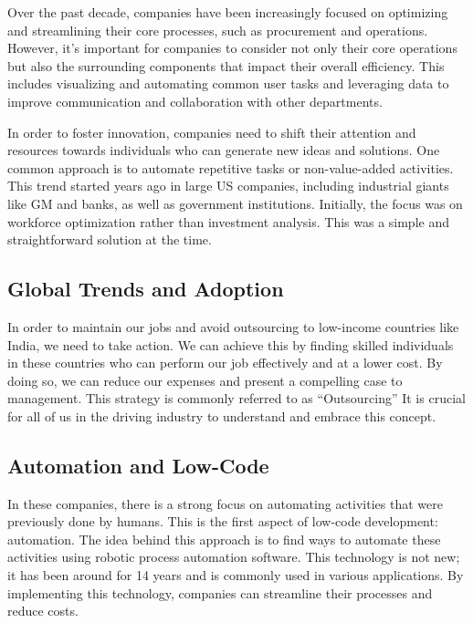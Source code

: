 Over the past decade, companies have
been increasingly focused on optimizing and streamlining their core
processes, such as procurement and operations. However, it's important
for companies to consider not only their core operations but also the
surrounding components that impact their overall efficiency. This
includes visualizing and automating common user tasks and leveraging
data to improve communication and collaboration with other departments.

In order to foster innovation, companies need to shift their attention
and resources towards individuals who can generate new ideas and
solutions. One common approach is to automate repetitive tasks or
non-value-added activities. This trend started years ago in large US
companies, including industrial giants like GM and banks, as well as
government institutions. Initially, the focus was on workforce
optimization rather than investment analysis. This was a simple and
straightforward solution at the time.

\subsection{Global Trends and
  Adoption}\label{global-trends-and-adoption}

In order to maintain our jobs and avoid outsourcing to
low-income countries like India, we need to take action. We can achieve
this by finding skilled individuals in these countries who can perform
our job effectively and at a lower cost. By doing so, we can reduce our
expenses and present a compelling case to management. This strategy is
commonly referred to as ``Outsourcing'' It is crucial for all
of us in the driving industry to understand and embrace this concept.

\subsection{Automation and Low-Code}\label{automation-and-low-code}

In these companies, there is a strong focus on automating activities
that were previously done by humans. This is the first aspect of
low-code development: automation. The idea behind this approach is to
find ways to automate these activities using robotic process automation
software. This technology is not new; it has been around for 14 years
and is commonly used in various applications. By implementing this
technology, companies can streamline their processes and reduce costs.

